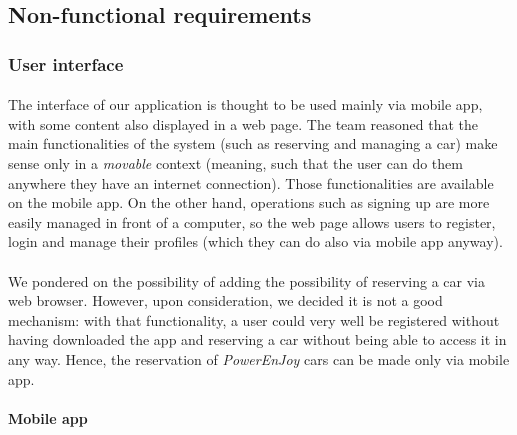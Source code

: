 \subsection{Non-functional requirements}
	\subsubsection{User interface}
	\paragraph{}The interface of our application is thought to be used mainly via mobile app, with some content also displayed in a web page. The team reasoned that the main functionalities of the system (such as reserving and managing a car) make sense only in a \textit{movable} context (meaning, such that the user can do them anywhere they have an internet connection). Those functionalities are available on the mobile app. On the other hand, operations such as signing up are more easily managed in front of a computer, so the web page allows users to register, login and manage their profiles (which they can do also via mobile app anyway).
	\paragraph{}We pondered on the possibility of adding the possibility of reserving a car via web browser. However, upon consideration, we decided it is not a good mechanism: with that functionality, a user could very well be registered without having downloaded the app and reserving a car without being able to access it in any way. Hence, the reservation of \textit{PowerEnJoy} cars can be made only via mobile app. 
	
	\paragraph{Mobile app}\mbox{}\\
	
